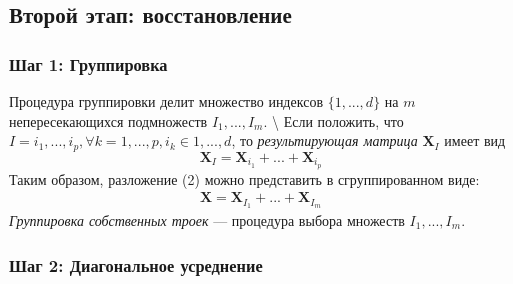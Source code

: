 \documentclass[
]{article}
\begin{document}
\subsection{Второй этап: восстановление}
\subsubsection{Шаг 1: Группировка}

Процедура группировки делит множество индексов \(\{1, ..., d\}\) на
\(m\) непересекающихся подмножеств \(I_1, ..., I_m\). \textbackslash{}
Если положить, что
\(I = {i_1, ..., i_p}, \forall k = 1, ...,p, i_k \in {1, ..., d}\), то
\textit{результирующая матрица} \(\textbf{X}_I\) имеет вид
\[\textbf{X}_I = \textbf{X}_{i_1} + ... + \textbf{X}_{i_p}\] Таким
образом, разложение (2) можно представить в сгруппированном виде:
\begin{align}
    \textbf{X} = \textbf{X}_{I_1} + ... + \textbf{X}_{I_m}
\end{align} \textit{Группировка собственных троек} --- процедура выбора
множеств \(I_1, ..., I_m\).

\subsubsection{Шаг 2: Диагональное усреднение}
\end{document}

